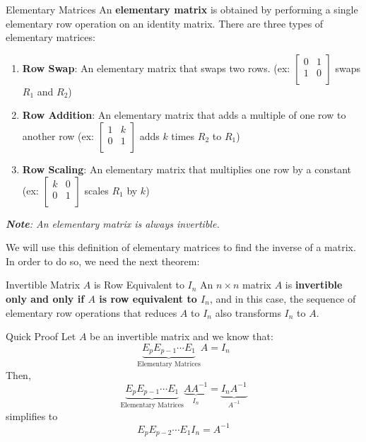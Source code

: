 \documentclass{article}
\begin{document}
\begin{definition}{Elementary Matrices}
	An \textbf{elementary matrix} is obtained by performing a single elementary row operation on an identity matrix. There are three types of elementary matrices:

	\begin{enumerate}
		\item
		      \textbf{Row Swap}: An elementary matrix that swaps two rows. (ex: $\begin{bmatrix}
				      0 & 1 \\
				      1 & 0 \\
			      \end{bmatrix}$ swaps $R_1$ and $R_2$)
		\item
		      \textbf{Row Addition}: An elementary matrix that adds a multiple of one row to another row (ex: $\begin{bmatrix}
				      1 & k \\
				      0 & 1 \\
			      \end{bmatrix}$ adds $k$ times $R_2$ to $R_1$)
		\item
		      \textbf{Row Scaling}: An elementary matrix that multiplies one row by a constant (ex: $\begin{bmatrix}
				      k & 0 \\
				      0 & 1 \\
			      \end{bmatrix}$ scales $R_1$ by $k$)
	\end{enumerate}

	\emph{\textbf{Note}: An elementary matrix is always invertible.}
\end{definition}
We will use this definition of elementary matrices to find the inverse of a matrix. In order to do so, we need the next theorem:
\begin{theorem}{Invertible Matrix $A$ is Row Equivalent to $I_n$}
	An $n \times n$ matrix $A$ is \textbf{invertible only and only if $A$ is row equivalent to $I_n$}, and in this case, the sequence of elementary row operations that reduces $A$ to $I_n$ also transforms $I_n$ to $A$.

	\begin{boxcontainer}{Quick Proof}
		Let $A$ be an invertible matrix and we know that:
		$$
			\underbrace{E_{p} E_{p - 1} \cdots E_1}_{\text{Elementary Matrices}}A = I_n
		$$
		Then,
		$$
			\underbrace{E_{p} E_{p - 1} \cdots E_1}_{\text{Elementary Matrices}} \underbrace{A A^{-1}}_{I_n} = \underbrace{I_n A^{-1}}_{A^{-1}}
		$$
		simplifies to
		$$
			E_p E_{p - 2} \cdots E_1 I_n = A^{-1}
		$$
	\end{boxcontainer}
\end{theorem}
\end{document}
